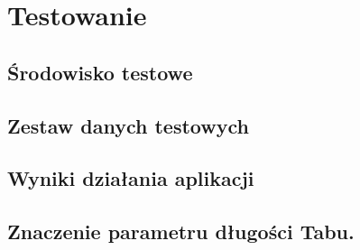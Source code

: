 \chapter{Testowanie}

\section{Środowisko testowe}
\section{Zestaw danych testowych}
\section{Wyniki działania aplikacji}
\section{Znaczenie parametru długości Tabu.}